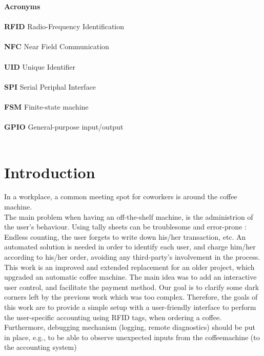 \documentclass[12pt]{article}
\begin{document}
 \listoffigures 
 \clearpage
\begingroup
  \pagestyle{empty}
  \null
  \newpage
\endgroup
\noindent
\textbf{ \LARGE{Acronyms}} \\~\\
\textbf{RFID} Radio-Frequency Identification\\~\\
\textbf{NFC} Near Field Communication\\~\\
\textbf{UID} Unique Identifier \\~\\
\textbf{SPI} Serial Periphal Interface\\~\\
\textbf{FSM} Finite-state machine\\~\\
\textbf{GPIO} General-purpose input/output\\~\\
 \clearpage
\begingroup
  \pagestyle{empty}
  \null
  \newpage
\endgroup

  \setcounter{page}{1}


  \section{Introduction}

    
    In a workplace, a common meeting spot for coworkers is around the coffee machine.\\
    The main problem when having an off-the-shelf machine, is the administrion of the user's behaviour. 
    Using tally sheets can be troublesome and error-prone : Endless counting, the user forgets to write down his/her transaction, etc.
    An automated solution is needed in order to identify each user, and charge him/her according to his/her order, avoiding any third-party's involvement in the process. \\
    
    This work is an improved and extended replacement for an older project, which upgraded an automatic coffee machine.
    The main idea was to add an interactive user control, and facilitate the payment method. 
    Our goal is to clarify some dark corners left by the previous work which was too complex.
    Therefore, the goals of this work are to provide a simple setup with a user-friendly interface to perform the user-specific accounting using RFID tags, 
    when ordering a coffee. Furthermore, debugging mechanism (logging, remote diagnostics) should be put in place,
    e.g., to be able to observe unexpected inputs from the coffeemachine (to the accounting system) 
    
\end{document}
